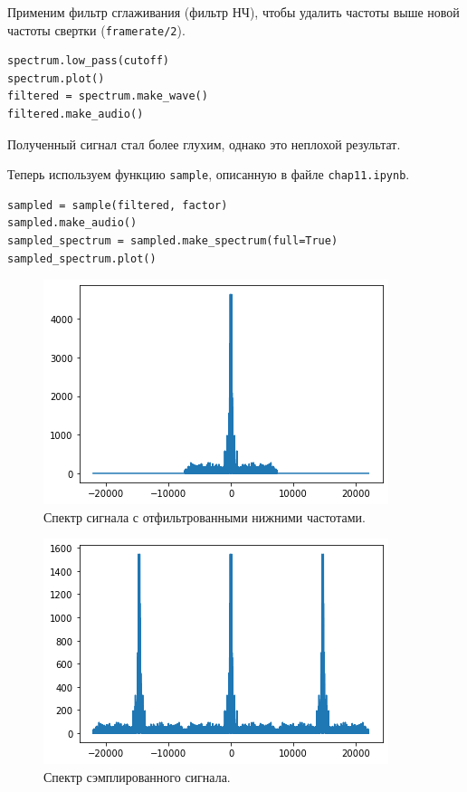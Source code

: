 \documentclass[a4paper, 14pt]{extarticle}
\begin{document}
    Применим фильтр сглаживания (фильтр НЧ), чтобы удалить частоты выше новой частоты свертки (\texttt{framerate/2}).

    \begin{lstlisting}[caption= Применение фильтра НЧ., label={lst:task3_low_pass_spectrum}]
spectrum.low_pass(cutoff)
spectrum.plot()
filtered = spectrum.make_wave()
filtered.make_audio()       \end{lstlisting}

    Полученный сигнал стал более глухим, однако это неплохой результат.

    Теперь используем функцию \texttt{sample}, описанную в файле \texttt{chap11.ipynb}.

    \begin{lstlisting}[caption= Дискретизация сигнала., label={lst:task3_spectrum_sampled}]
sampled = sample(filtered, factor)
sampled.make_audio()
sampled_spectrum = sampled.make_spectrum(full=True)
sampled_spectrum.plot()     \end{lstlisting}

    \begin{figure}[H]
        \centering
        \includegraphics[width=0.82\linewidth]{resources/Images/task3_low_pass_spectrum}
        \caption{Спектр сигнала с отфильтрованными нижними частотами.}
        \label{fig:task3_low_pass_spectrum}
    \end{figure}

    \begin{figure}[H]
        \centering
        \includegraphics[width=0.82\linewidth]{resources/Images/task3_spectrum_sampled}
        \caption{Спектр сэмплированного сигнала.}
        \label{fig:task3_spectrum_sampled}
    \end{figure}
\end{document}
